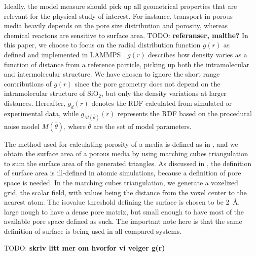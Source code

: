 \documentclass[aps,pre,twocolumn,letterpaper,floatfix,showpacs]{revtex4}
\newcommand{\todo}[1]{ {\color{Magenta} TODO: \color{Blue} \textbf{#1} }}
\begin{document}
Ideally, the model measure should pick up all geometrical properties that are relevant for the physical study of interest. For instance, transport in porous media heavily depends on the pore size distribution and porosity, whereas chemical reactons are sensitive to surface area. \todo{referanser, malthe?} In this paper, we choose to focus on the radial distribution function $g(r)$ as defined and implemented in LAMMPS \cite{plimpton1995fast}. $g(r)$ describes how density varies as a function of distance from a reference particle, picking up both the intramolecular and intermolecular structure. We have chosen to ignore the short range contributions of $g(r)$ since the pore geometry does not depend on the intramolecular structure of SiO$_2$, but only the density variations at larger distances. Hereafter, $g_d(r)$ denotes the RDF calculated from simulated or experimental data, while $g_{M(\bar \theta)}(r)$ represents the RDF based on the procedural noise model $M(\bar \theta)$, where $\bar \theta$ are the set of model parameters. 

The method used for calculating porosity of a media is defined as in \cite{gelb1998characterization}, and we obtain the surface area of a porous media by using marching cubes triangulation to sum the surface area of the generated triangles. As discussed in \cite{gelb1998characterization}, the definition of surface area is ill-defined in atomic simulations, because a definition of pore space is needed. In the marching cubes triangulation, we generate a voxelized grid, the scalar field, with values being the distance from the voxel center to the nearest atom. The isovalue threshold defining the surface is chosen to be \SI{2}{\angstrom}, large nough to have a dense pore matrix, but small enough to have most of the available pore space defined as such. The important note here is that the same definition of surface is being used in all compared systems. 

\todo{skriv litt mer om hvorfor vi velger g(r)}






\end{document}
